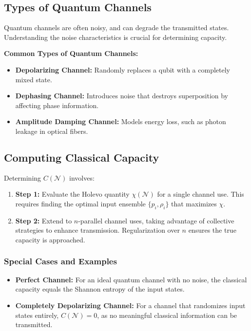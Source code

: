 \subsection{Types of Quantum Channels}
Quantum channels are often noisy, and can degrade the transmitted states. Understanding the noise characteristics is crucial for determining capacity.

\textbf{Common Types of Quantum Channels:}
\begin{itemize}
    \item \textbf{Depolarizing Channel:} Randomly replaces a qubit with a completely mixed state.
    \item \textbf{Dephasing Channel:} Introduces noise that destroys superposition by affecting phase information.
    \item \textbf{Amplitude Damping Channel:} Models energy loss, such as photon leakage in optical fibers.
\end{itemize}

\subsection{Computing Classical Capacity}
Determining \(C(\mathcal{N})\) involves:
\begin{enumerate}
    \item \textbf{Step 1:} Evaluate the Holevo quantity \(\chi(\mathcal{N})\) for a single channel use. This requires finding the optimal input ensemble \(\{p_i, \rho_i\}\) that maximizes \(\chi\).
    \item \textbf{Step 2:} Extend to \(n\)-parallel channel uses, taking advantage of collective strategies to enhance transmission. Regularization over \(n\) ensures the true capacity is approached.
\end{enumerate}

\subsubsection{Special Cases and Examples}
\begin{itemize}
    \item \textbf{Perfect Channel:} For an ideal quantum channel with no noise, the classical capacity equals the Shannon entropy of the input states.
    \item \textbf{Completely Depolarizing Channel:} For a channel that randomizes input states entirely, \(C(\mathcal{N}) = 0\), as no meaningful classical information can be transmitted.
\end{itemize}

